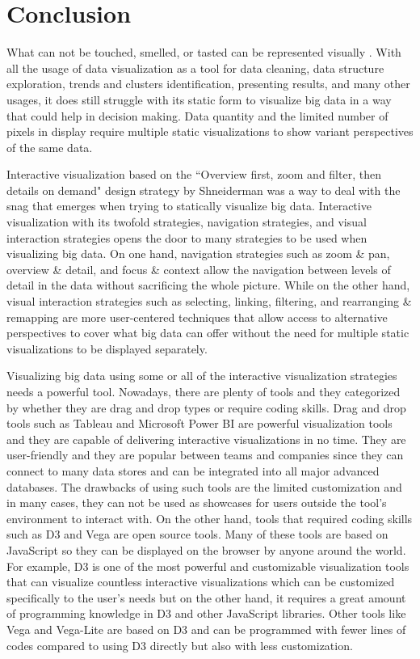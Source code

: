 \section{Conclusion}

What can not be touched, smelled, or tasted can be represented visually \cite{sancho2014approach}. With all the usage of data visualization as a tool for data cleaning, data structure exploration, trends and clusters identification, presenting results, and many other usages, it does still struggle with its static form to visualize big data in a way that could help in decision making. Data quantity and the limited number of pixels in display require multiple static visualizations to show variant perspectives of the same data. 

Interactive visualization based on the ``Overview first, zoom and filter, then details on demand" \cite{shneiderman2003eyes} design strategy by Shneiderman was a way to deal with the snag that emerges when trying to statically visualize big data. Interactive visualization with its twofold strategies, navigation strategies, and visual interaction strategies opens the door to many strategies to be used when visualizing big data. On one hand, navigation strategies such as zoom \& pan, overview \& detail, and focus \& context allow the navigation between levels of detail in the data without sacrificing the whole picture. While on the other hand, visual interaction strategies such as selecting, linking, filtering, and rearranging \& remapping are more user-centered techniques that allow access to alternative perspectives to cover what big data can offer without the need for multiple static visualizations to be displayed separately. 

Visualizing big data using some or all of the interactive visualization strategies needs a powerful tool. Nowadays, there are plenty of tools and they categorized by whether they are drag and drop types or require coding skills. Drag and drop tools such as Tableau and Microsoft Power BI are powerful visualization tools and they are capable of delivering interactive visualizations in no time. They are user-friendly and they are popular between teams and companies since they can connect to many data stores and can be integrated into all major advanced databases. The drawbacks of using such tools are the limited customization and in many cases, they can not be used as showcases for users outside the tool's environment to interact with. On the other hand, tools that required coding skills such as D3 and Vega are open source tools. Many of these tools are based on JavaScript so they can be displayed on the browser by anyone around the world. For example, D3 is one of the most powerful and customizable visualization tools that can visualize countless interactive visualizations which can be customized specifically to the user's needs but on the other hand, it requires a great amount of programming knowledge in D3 and other JavaScript libraries. Other tools like Vega and Vega-Lite are based on D3 and can be programmed with fewer lines of codes compared to using D3 directly but also with less customization. 

